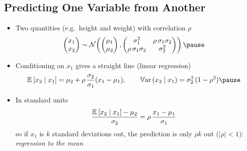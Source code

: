 \begin{slide}
\section[-2]{Predicting One Variable from Another}

\begin{PauseHighLight}
  \begin{itemize}\squeeze
  \item Two quantities (e.g.\ height and weight) with correlation $\rho$
    \begin{align*}
      \begin{pmatrix} x_1 \\ x_2\end{pmatrix} \sim
      \mathcal{N}\!\left(\begin{pmatrix}\mu_1\\ \mu_2\end{pmatrix},
      \begin{pmatrix} \sigma_1^2 & \rho\,\sigma_1\sigma_2 \\
        \rho\,\sigma_1\sigma_2 & \sigma_2^2\end{pmatrix}\right)\pause
    \end{align*}
  \item Conditioning on $x_1$ gives a straight line (linear regression)
    \begin{align*}
      \av{x_2\mid x_1} = \mu_2 + \rho\,\frac{\sigma_2}{\sigma_1}(x_1-\mu_1),
      \qquad
      \Var{x_2\mid x_1} = \sigma_2^2\,(1-\rho^2)\pause
    \end{align*}
  \item In standard units
    \begin{align*}
      \frac{\mathbb{E}_{}\left[ x_2\mid x_1 \right]-\mu_2}{\sigma_2} = \rho\,\frac{x_1-\mu_1}{\sigma_1}
    \end{align*}
    so if $x_1$ is $k$ standard deviations out, the prediction is only
    $\rho k$ out\pause{} ($|\rho|<1$): \emph{regression to the mean}\pauseb
  \end{itemize}
\end{PauseHighLight}

\end{slide}


